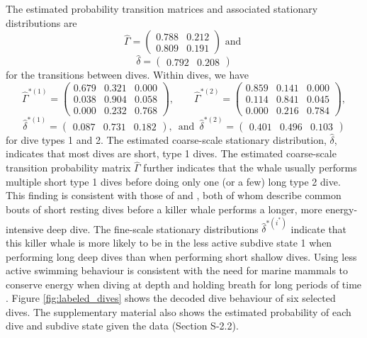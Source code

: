 The estimated probability transition matrices and associated stationary distributions are
%
$$\hat \Gamma = \begin{pmatrix} 
0.788 & 0.212 \\
0.809 & 0.191
\end{pmatrix} \text{ and }$$
$$\hat \delta = \begin{pmatrix} 0.792 & 0.208 \end{pmatrix}$$
%
for the transitions between dives. Within dives, we have
$$\hat \Gamma^{*(1)} = \begin{pmatrix} 
0.679 & 0.321 & 0.000 \\
0.038 & 0.904 & 0.058 \\
0.000 & 0.232 & 0.768
\end{pmatrix}, \qquad 
\hat \Gamma^{*(2)} = \begin{pmatrix} 
0.859 & 0.141 & 0.000 \\
0.114 & 0.841 & 0.045 \\
0.000 & 0.216 & 0.784
\end{pmatrix},$$
$$\hat \delta^{*(1)} = \begin{pmatrix} 0.087 & 0.731 & 0.182 \end{pmatrix}, \enspace \text{and} \enspace \hat \delta^{*(2)} = \begin{pmatrix} 0.401 & 0.496 & 0.103 \end{pmatrix}$$
%
for dive types 1 and 2.
The estimated coarse-scale stationary distribution, $\hat{\delta}$, indicates that most dives are short, type 1 dives. The estimated coarse-scale transition probability matrix $\hat \Gamma$ further indicates that the whale usually performs multiple short type 1 dives before doing only one (or a few) long type 2 dive. This finding is consistent with those of \citet{Tennessen:2019b} and \citet{Williams:2009}, both of whom describe common bouts of short resting dives before a killer whale performs a longer, more energy-intensive deep dive. The fine-scale stationary distributions $\hat{\delta}^{*(i^*)}$ indicate that this killer whale is more likely to be in the less active subdive state 1 when performing long deep dives than when performing short shallow dives. Using less active swimming behaviour is consistent with the need for marine mammals to conserve energy when diving at depth and holding breath for long periods of time \citep{Williams:1999,Hastie:2006}. Figure \ref{fig:labeled_dives} shows the decoded dive behaviour of six selected dives. The supplementary material also shows the estimated probability of each dive and subdive state given the data (Section S-2.2).

